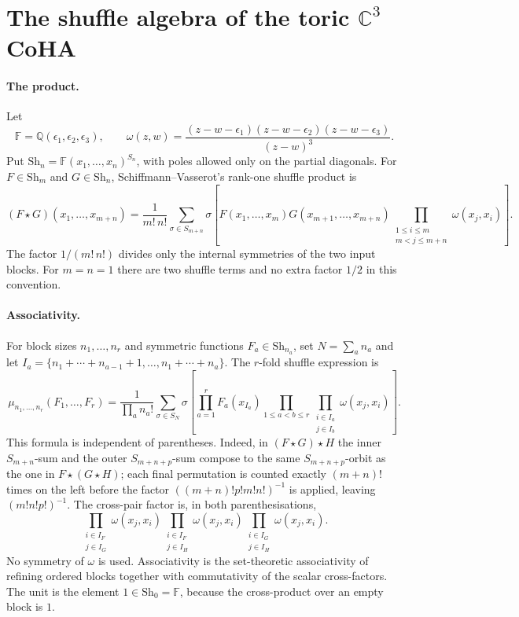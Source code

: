 \providecommand{\Sh}{\mathrm{Sh}}
\providecommand{\CoHA}{\mathrm{CoHA}}
\providecommand{\Sym}{\mathrm{Sym}}
\providecommand{\Eone}{E_1}
\providecommand{\Etwo}{E_2}
\providecommand{\Winf}{\mathcal{W}_{1+\infty}}
\providecommand{\End}{\operatorname{End}}

\section*{The shuffle algebra of the toric \texorpdfstring{$\mathbb{C}^3$}{C3} CoHA}
\label{wn:sec:shuffle-first-principles-c3}

\paragraph{The product.}
Let
\[
 \mathbb{F}=\mathbb{Q}(\epsilon_1,\epsilon_2,\epsilon_3),
 \qquad
 \omega(z,w)
 =
 \frac{(z-w-\epsilon_1)(z-w-\epsilon_2)(z-w-\epsilon_3)}
      {(z-w)^3}.
\]
Put $\Sh_n=\mathbb{F}(x_1,\ldots,x_n)^{S_n}$, with poles allowed only on
the partial diagonals. For
$F\in \Sh_m$ and $G\in \Sh_n$, Schiffmann--Vasserot's rank-one shuffle
product is
\[
(F\star G)(x_1,\ldots,x_{m+n})
=
\frac{1}{m!\,n!}
\sum_{\sigma\in S_{m+n}}
\sigma\!\left[
F(x_1,\ldots,x_m)G(x_{m+1},\ldots,x_{m+n})
\prod_{\substack{1\le i\le m\\m<j\le m+n}}\omega(x_j,x_i)
\right].
\]
The factor $1/(m!\,n!)$ divides only the internal symmetries of the two
input blocks. For $m=n=1$ there are two shuffle terms and no extra
factor $1/2$ in this convention.

\paragraph{Associativity.}
For block sizes $n_1,\ldots,n_r$ and symmetric functions
$F_a\in\Sh_{n_a}$, set $N=\sum_a n_a$ and let
$I_a=\{n_1+\cdots+n_{a-1}+1,\ldots,n_1+\cdots+n_a\}$. The $r$-fold
shuffle expression is
\[
\mu_{n_1,\ldots,n_r}(F_1,\ldots,F_r)
=
\frac{1}{\prod_a n_a!}
\sum_{\sigma\in S_N}
\sigma\!\left[
\prod_{a=1}^r F_a(x_{I_a})
\prod_{1\le a<b\le r}\prod_{\substack{i\in I_a\\j\in I_b}}
\omega(x_j,x_i)
\right].
\]
This formula is independent of parentheses. Indeed, in
$(F\star G)\star H$ the inner $S_{m+n}$-sum and the outer
$S_{m+n+p}$-sum compose to the same $S_{m+n+p}$-orbit as the one in
$F\star(G\star H)$; each final permutation is counted exactly
$(m+n)!$ times on the left before the factor
$((m+n)!p!m!n!)^{-1}$ is applied, leaving
$(m!n!p!)^{-1}$. The cross-pair factor is, in both parenthesisations,
\[
\prod_{\substack{i\in I_F\\j\in I_G}}\omega(x_j,x_i)
\prod_{\substack{i\in I_F\\j\in I_H}}\omega(x_j,x_i)
\prod_{\substack{i\in I_G\\j\in I_H}}\omega(x_j,x_i).
\]
No symmetry of $\omega$ is used. Associativity is the set-theoretic
associativity of refining ordered blocks together with commutativity of
the scalar cross-factors. The unit is the element $1\in\Sh_0=\mathbb{F}$,
because the cross-product over an empty block is $1$.

